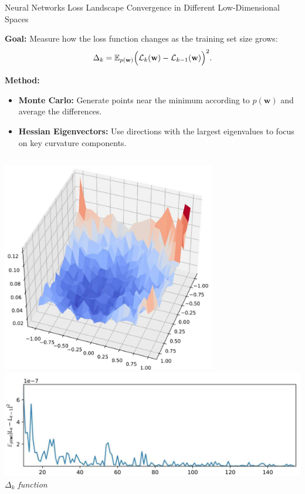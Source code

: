 \documentclass{beamer}
\begin{document}
\begin{frame}{Neural Networks Loss Landscape Convergence in Different Low-Dimensional Spaces}

    \textbf{Goal:} Measure how the loss function changes as the training set size grows:
    \[
        \Delta_k = \mathbb{E}_{p(\mathbf{w})}\Bigl(\mathcal{L}_{k}(\mathbf{w}) - \mathcal{L}_{k-1}(\mathbf{w})\Bigr)^2.
    \]

    \textbf{Method:}
    \begin{itemize}
        \item \textbf{Monte Carlo:} Generate points near the minimum according to $p(\mathbf{w})$ and average the differences.
        \item \textbf{Hessian Eigenvectors:} Use directions with the largest eigenvalues to focus on key curvature components.
    \end{itemize}

    \begin{columns}[t]
        \centering
        \hspace*{-2cm}
        \includegraphics[width=0.70\textwidth]{img/LS_16.pdf}\\

        \centering
        \vspace*{-3cm}
        \hspace*{-2.2cm}
        \includegraphics[width=1.375\textwidth]{img/D_32.pdf}\\
        \hspace*{-1.2cm}
        \scriptsize \textit{$\Delta_k$ function}
    \end{columns}

\end{frame}
\end{document}
